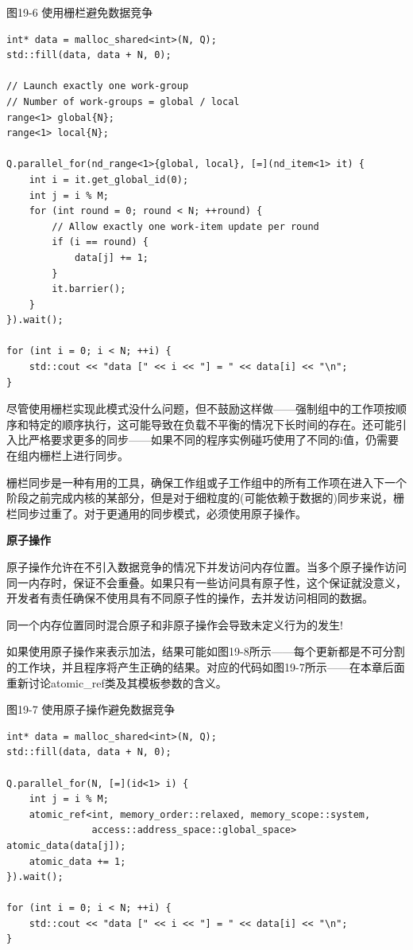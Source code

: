 \hspace*{\fill} \par %
图19-6 使用栅栏避免数据竞争
\begin{lstlisting}[caption={}]
int* data = malloc_shared<int>(N, Q);
std::fill(data, data + N, 0);

// Launch exactly one work-group
// Number of work-groups = global / local
range<1> global{N};
range<1> local{N};

Q.parallel_for(nd_range<1>{global, local}, [=](nd_item<1> it) {
	int i = it.get_global_id(0);
	int j = i % M;
	for (int round = 0; round < N; ++round) {
		// Allow exactly one work-item update per round
		if (i == round) {
			data[j] += 1;
		}
		it.barrier();
	}
}).wait();

for (int i = 0; i < N; ++i) {
	std::cout << "data [" << i << "] = " << data[i] << "\n";
}
\end{lstlisting}

尽管使用栅栏实现此模式没什么问题，但不鼓励这样做——强制组中的工作项按顺序和特定的顺序执行，这可能导致在负载不平衡的情况下长时间的存在。还可能引入比严格要求更多的同步——如果不同的程序实例碰巧使用了不同的i值，仍需要在组内栅栏上进行同步。\par

栅栏同步是一种有用的工具，确保工作组或子工作组中的所有工作项在进入下一个阶段之前完成内核的某部分，但是对于细粒度的(可能依赖于数据的)同步来说，栅栏同步过重了。对于更通用的同步模式，必须使用原子操作。\par

\hspace*{\fill} \par %
\textbf{原子操作}

原子操作允许在不引入数据竞争的情况下并发访问内存位置。当多个原子操作访问同一内存时，保证不会重叠。如果只有一些访问具有原子性，这个保证就没意义，开发者有责任确保不使用具有不同原子性的操作，去并发访问相同的数据。\par

\begin{tcolorbox}[colback=red!5!white,colframe=red!75!black]
同一个内存位置同时混合原子和非原子操作会导致未定义行为的发生!
\end{tcolorbox}

如果使用原子操作来表示加法，结果可能如图19-8所示——每个更新都是不可分割的工作块，并且程序将产生正确的结果。对应的代码如图19-7所示——在本章后面重新讨论atomic\_ref类及其模板参数的含义。\par

\hspace*{\fill} \par %
图19-7 使用原子操作避免数据竞争
\begin{lstlisting}[caption={}]
int* data = malloc_shared<int>(N, Q);
std::fill(data, data + N, 0);

Q.parallel_for(N, [=](id<1> i) {
	int j = i % M;
	atomic_ref<int, memory_order::relaxed, memory_scope::system,
			   access::address_space::global_space> atomic_data(data[j]);
	atomic_data += 1;
}).wait();

for (int i = 0; i < N; ++i) {
	std::cout << "data [" << i << "] = " << data[i] << "\n";
}
\end{lstlisting}

